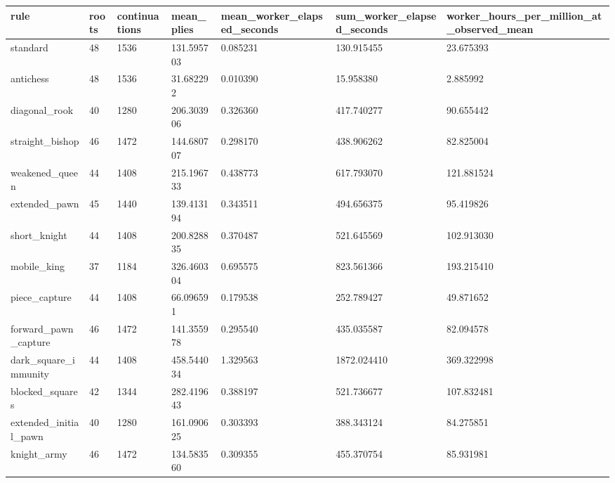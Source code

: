 \begin{tabular}{lllllll}
\hline
rule & roots & continuations & mean\_plies & mean\_worker\_elapsed\_seconds & sum\_worker\_elapsed\_seconds & worker\_hours\_per\_million\_at\_observed\_mean \\
\hline
standard & 48 & 1536 & 131.595703 & 0.085231 & 130.915455 & 23.675393 \\
antichess & 48 & 1536 & 31.682292 & 0.010390 & 15.958380 & 2.885992 \\
diagonal\_rook & 40 & 1280 & 206.303906 & 0.326360 & 417.740277 & 90.655442 \\
straight\_bishop & 46 & 1472 & 144.680707 & 0.298170 & 438.906262 & 82.825004 \\
weakened\_queen & 44 & 1408 & 215.196733 & 0.438773 & 617.793070 & 121.881524 \\
extended\_pawn & 45 & 1440 & 139.413194 & 0.343511 & 494.656375 & 95.419826 \\
short\_knight & 44 & 1408 & 200.828835 & 0.370487 & 521.645569 & 102.913030 \\
mobile\_king & 37 & 1184 & 326.460304 & 0.695575 & 823.561366 & 193.215410 \\
piece\_capture & 44 & 1408 & 66.096591 & 0.179538 & 252.789427 & 49.871652 \\
forward\_pawn\_capture & 46 & 1472 & 141.355978 & 0.295540 & 435.035587 & 82.094578 \\
dark\_square\_immunity & 44 & 1408 & 458.544034 & 1.329563 & 1872.024410 & 369.322998 \\
blocked\_squares & 42 & 1344 & 282.419643 & 0.388197 & 521.736677 & 107.832481 \\
extended\_initial\_pawn & 40 & 1280 & 161.090625 & 0.303393 & 388.343124 & 84.275851 \\
knight\_army & 46 & 1472 & 134.583560 & 0.309355 & 455.370754 & 85.931981 \\
\hline
\end{tabular}
